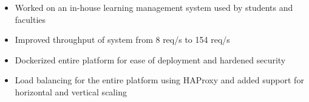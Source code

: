 \documentclass[10pt,a4paper]{altacv}
\begin{document}
\begin{itemize}
    \item Worked on an in-house learning management system used by students and faculties
    \item Improved throughput of system from 8 req/s to 154 req/s
    \item Dockerized entire platform for ease of deployment and hardened security
    \item Load balancing for the entire platform using HAProxy and added support for horizontal and vertical scaling
\end{itemize}

\end{document}
